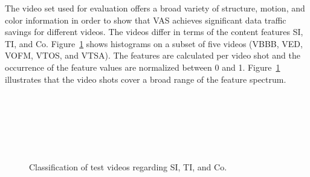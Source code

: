 The video set used for evaluation offers a broad variety of structure, motion, and color information in order to show that \ac{VAS} achieves significant data traffic savings for different videos.
The videos differ in terms of the content features \ac{SI}, \ac{TI}, and \ac{Co}.
Figure~\ref{fig:730_picssiti} shows histograms on a subset of five videos (VBBB, VED, VOFM, VTOS, and VTSA).
The features are calculated per video shot and the occurrence of the feature values are normalized between 0 and 1.
Figure~\ref{fig:730_picssiti} illustrates that the video shots cover a broad range of the feature spectrum.
\begin{figure}
	\centering
	\\
	\\
	\\
	\\
	\\
	\caption[Classification of the videos used for evaluation]{Classification of test videos regarding SI, TI, and Co.}
\label{fig:730_picssiti}
\end{figure}
